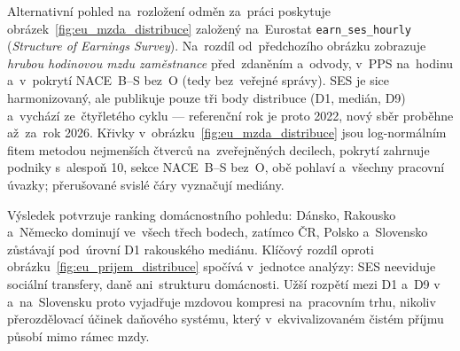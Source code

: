 Alternativní pohled na~rozložení odměn za~práci poskytuje obrázek~\ref{fig:eu_mzda_distribuce} založený na~Eurostat \texttt{earn\_ses\_hourly} (\emph{Structure of Earnings Survey}).
Na~rozdíl od~předchozího obrázku zobrazuje \emph{hrubou hodinovou mzdu zaměstnance} před~zdaněním a~odvody, v~\ac{PPS} na~hodinu a~v~pokrytí \ac{NACE}~B--S bez~O (tedy bez~veřejné správy).
\acs{SES} je sice harmonizovaný, ale publikuje pouze tři body distribuce (D1, medián, D9) a~vychází ze~čtyřletého cyklu --- referenční rok je proto 2022, nový sběr proběhne až~za~rok 2026.
Křivky v~obrázku~\ref{fig:eu_mzda_distribuce} jsou log-normálním fitem metodou nejmenších čtverců na~zveřejněných decilech, pokrytí zahrnuje podniky s~alespoň \SI{10}{\person}, sekce \acs{NACE}~B--S bez~O, obě pohlaví a~všechny pracovní úvazky; přerušované svislé čáry vyznačují mediány.

Výsledek potvrzuje ranking domácnostního pohledu: Dánsko, Rakousko a~Německo dominují ve~všech třech bodech, zatímco \ac{ČR}, Polsko a~Slovensko zůstávají pod~úrovní D1 rakouského mediánu.
Klíčový rozdíl oproti obrázku~\ref{fig:eu_prijem_distribuce} spočívá v~jednotce analýzy: \acs{SES} neeviduje sociální transfery, daně ani~strukturu domácnosti.
Užší rozpětí mezi D1 a~D9 v~ a~na~Slovensku proto vyjadřuje mzdovou kompresi na~pracovním trhu, nikoliv přerozdělovací účinek daňového systému, který v~ekvivalizovaném čistém příjmu působí mimo rámec mzdy.


